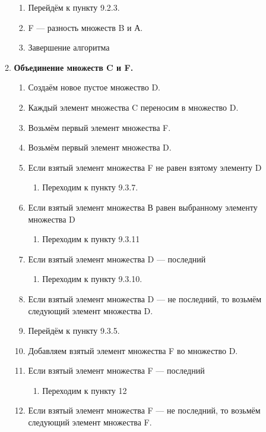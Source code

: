 \documentclass[a4paper,12pt]{extarticle}
\begin{document}
\begin{enumerate}
\begin{enumerate}[label*=\arabic*.]
\begin{enumerate}[label*=\arabic*.]
      \item Перейдём к пункту 9.2.3.
      \item F — разность множеств B и А.
      \item Завершение алгоритма
    \end{enumerate}
    \item\textbf{Объединение множеств C и F.}
    \begin{enumerate}[label*=\arabic*.]
      \item Создаём новое пустое множество D.
      \item Каждый элемент множества C переносим в множество D.
      \item Возьмём первый элемент множества F.
      \item Возьмём первый элемент множества D.
      \item Если взятый элемент множества F не равен взятому элементу D
      \begin{enumerate}[label*=\arabic*.]
        \item Переходим к пункту 9.3.7.
      \end{enumerate}
      \item Если взятый элемент множества В равен выбранному элементу множества D
      \begin{enumerate}[label*=\arabic*.]
        \item Переходим к пункту 9.3.11
      \end{enumerate}
      \item Если взятый элемент множества D — последний
      \begin{enumerate}[label*=\arabic*.]
        \item Переходим к пункту 9.3.10.
      \end{enumerate}
      \item Если взятый элемент множества D — не последний, то возьмём следующий элемент множества D.
      \item Перейдём к пункту 9.3.5.
      \item Добавляем взятый элемент множества F во множество D.
      \item Если взятый элемент множества F — последний
      \begin{enumerate}[label*=\arabic*.]
        \item Переходим к пункту 12
      \end{enumerate}
      \item Если взятый элемент множества F — не последний, то возьмём следующий элемент множества F.

\end{enumerate}
\end{enumerate}
\end{enumerate}
\end{document}
